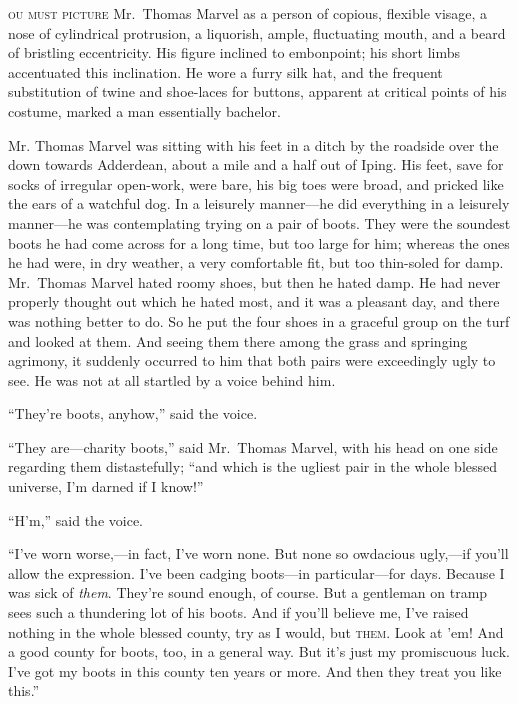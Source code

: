 \label{ch:09}
\begin{ChapterStart}
\vspace*{2\nbs}

\vspace{1.5\nbs}
\end{ChapterStart}

\kern-4pt\textsc{ou must picture} Mr.\ Thomas Marvel as a person of copious, flexible visage, a nose of cylindrical protrusion, a liquorish, ample, fluctuating mouth, and a beard of bristling eccentricity. His figure inclined to embonpoint; his short limbs accentuated this inclination. He wore a furry silk hat, and the frequent substitution of twine and shoe-laces for buttons, apparent at critical points of his costume, marked a man essentially bachelor.

Mr. Thomas Marvel was sitting with his feet in a ditch by the roadside over the down towards Adderdean, about a mile and a half out of Iping. His feet, save for socks of irregular open-work, were bare, his big toes were broad, and pricked like the ears of a watchful dog. In a leisurely manner—he did everything in a leisurely manner—he was contemplating trying on a pair of boots. They were the soundest boots he had come across for a long time, but too large for him; whereas the ones he had were, in dry weather, a very comfortable fit, but too thin-soled for damp. Mr.\ Thomas Marvel hated roomy shoes, but then he hated damp. He had never properly thought out which he hated most, and it was a pleasant day, and there was nothing better to do. So he put the four shoes in a graceful group on the turf and looked at them. And seeing them there among the grass and springing agrimony, it suddenly occurred to him that both pairs were exceedingly ugly to see. He was not at all startled by a voice behind him.

“They’re boots, anyhow,” said the voice.

“They are—charity boots,” said Mr.\ Thomas Marvel, with his head on one side regarding them distastefully; “and which is the ugliest pair in the whole blessed universe, I’m darned if I know!”

“H’m,” said the voice.

“I’ve worn worse,—in fact, I’ve worn none. But none so owdacious ugly,—if you’ll allow the expression. I’ve been cadging boots—in particular—for days. Because I was sick of \emph{them}. They’re sound enough, of course. But a gentleman on tramp sees such a thundering lot of his boots. And if you’ll believe me, I’ve raised nothing in the whole blessed county, try as I would, but \textsc{them}. Look at ’em! And a good county for boots, too, in a general way. But it’s just my promiscuous luck. I’ve got my boots in this county ten years or more. And then they treat you like this.”

